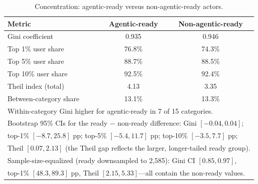 \begin{table}[t]
  \centering
  \caption{Concentration: agentic-ready versus non-agentic-ready actors.}
  \label{tab:eligibility_concentration}
  \small
  \begin{tabular}{lcc}
    \toprule
    Metric & Agentic-ready & Non-agentic-ready \\
    \midrule
    Gini coefficient & 0.935 & 0.946 \\
    Top 1\% user share & 76.8\% & 74.3\% \\
    Top 5\% user share & 88.7\% & 88.5\% \\
    Top 10\% user share & 92.5\% & 92.4\% \\
    Theil index (total) & 4.13 & 3.35 \\
    Between-category share & 13.1\% & 13.3\% \\
    \bottomrule
    \multicolumn{3}{l}{\footnotesize Within-category Gini higher for agentic-ready in 7 of 15 categories.} \\
    \multicolumn{3}{l}{\footnotesize Bootstrap 95\% CIs for the ready $-$ non-ready difference: Gini $[-0.04, 0.04]$;} \\
    \multicolumn{3}{l}{\footnotesize top-1\% $[-8.7, 25.8]$ pp; top-5\% $[-5.4, 11.7]$ pp; top-10\% $[-3.5, 7.7]$ pp;} \\
    \multicolumn{3}{l}{\footnotesize Theil $[0.07, 2.13]$ (the Theil gap reflects the larger, longer-tailed ready group).} \\
    \multicolumn{3}{l}{\footnotesize Sample-size-equalized (ready downsampled to 2{,}585): Gini CI $[0.85, 0.97]$,} \\
    \multicolumn{3}{l}{\footnotesize top-1\% $[48.3, 89.3]$ pp, Theil $[2.15, 5.33]$---all contain the non-ready values.}
  \end{tabular}
\end{table}